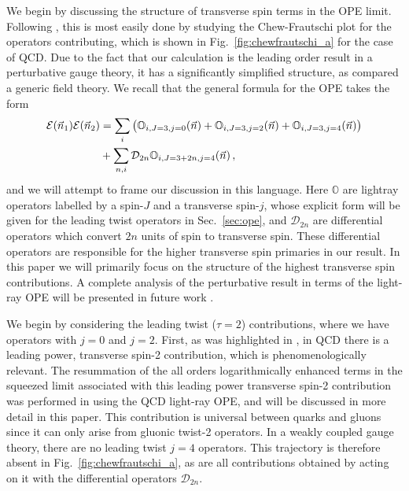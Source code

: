 \documentclass[letterpaper,11pt]{article}
\def\cD{\mathcal{D}}
\def\cE{\mathcal{E}}
\def\nn{{\nonumber}}
\DeclareRobustCommand{\Sec}[1]{Sec.~\ref{#1}}
\DeclareRobustCommand{\Fig}[1]{Fig.~\ref{#1}}
\begin{document}
We begin by discussing the structure of transverse spin terms in the OPE limit. Following \cite{1822249}, this is most easily done by studying the Chew-Frautschi plot for the operators contributing, which is shown in \Fig{fig:chewfrautschi_a} for the case of QCD. Due to the fact that our calculation is the leading order result in a perturbative gauge theory, it has a significantly simplified structure, as compared a generic field theory. We recall that the general formula for the OPE takes the form \cite{1822249}
\begin{align}\label{eq:EEOPE}
\cE(\vec n_1) \cE(\vec n_2) &=\sum\limits_i \big( \mathbb{O}_{i,J=3,j=0}(\vec n) + \mathbb{O}_{i,J=3,j=2}(\vec n)  + \mathbb{O}_{i,J=3,j=4}(\vec n)   \big)\nn \\
&+\sum\limits_{n,i} \cD_{2n} \mathbb{O}_{i,J=3+2n,j=4}(\vec n)   \,,
\end{align}
and we will attempt to frame our discussion in this language. Here $\mathbb{O}$ are lightray operators labelled by a spin-$J$ and a transverse spin-$j$, whose explicit form will be given for the leading twist operators in \Sec{sec:ope}, and $\cD_{2n}$ are differential operators \cite{Karateev:2017jgd,1822249} which convert $2n$ units of spin to transverse spin. These differential operators are responsible for the higher transverse spin primaries in our result. In this paper we will primarily focus on the structure of the highest transverse spin contributions. A complete analysis of the perturbative result in terms of the light-ray OPE will be presented in future work \cite{blocks:forthcoming}.


We begin by considering the leading twist ($\tau=2$) contributions, where we have operators with $j=0$ and $j=2$.
First, as was highlighted in \cite{Chen:2020adz}, in QCD there is a leading power, transverse spin-2 contribution, which is phenomenologically relevant. The resummation of the all orders logarithmically enhanced terms in the squeezed limit associated with this leading power transverse spin-2 contribution was performed in \cite{Chen:2020adz} using the QCD light-ray OPE, and will be discussed in more detail in this paper. This contribution is universal between quarks and gluons since it can only arise from gluonic twist-2 operators. In a weakly coupled gauge theory, there are no leading twist $j=4$ operators. This trajectory is therefore absent in \Fig{fig:chewfrautschi_a}, as are all contributions obtained by acting on it with the differential operators $\cD_{2n}$.
\end{document}
